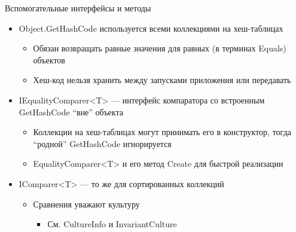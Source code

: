 \documentclass{../../slides-style}
\begin{document}
    \begin{frame}{Вспомогательные интерфейсы и методы}
        \begin{itemize}
            \item Object.GetHashCode используется всеми коллекциями на хеш-таблицах
            \begin{itemize}
                \item Обязан возвращать равные значения для равных (в терминах Equals) объектов
                \item Хеш-код нельзя хранить между запусками приложения или передавать
            \end{itemize}
            \item IEqualityComparer<T> --- интерфейс компаратора со встроенным GetHashCode \enquote{вне} объекта
            \begin{itemize}
                \item Коллекции на хеш-таблицах могут принимать его в конструктор, тогда \enquote{родной} GetHashCode игнорируется
                \item EqualityComparer<T> и его метод Create для быстрой реализации
            \end{itemize}
            \item IComparer<T> --- то же для сортированных коллекций
            \begin{itemize}
                \item Сравнения уважают культуру
                \begin{itemize}
                    \item См. CultureInfo и InvariantCulture
                \end{itemize}
            \end{itemize}
        \end{itemize}
    \end{frame}
\end{document}
